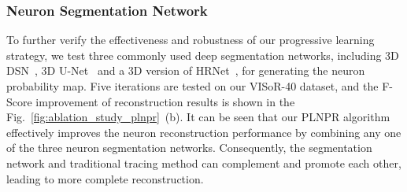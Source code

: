 

\subsubsection{Neuron Segmentation Network}

To further verify the effectiveness and robustness of our progressive learning strategy, we test three commonly used deep segmentation networks, including 3D DSN~\cite{Dou2017}, 3D U-Net~\cite{Cicek2016} and a 3D version of HRNet~\cite{Sun2019}, for generating the neuron probability map.
Five iterations are tested on our VISoR-40 dataset, and the F-Score improvement of reconstruction results is shown in the Fig.~\ref{fig:ablation_study_plnpr}~(b). 
%
It can be seen that our PLNPR algorithm effectively improves the neuron reconstruction performance by combining any one of the three neuron segmentation networks.
Consequently, the segmentation network and traditional tracing method can complement and promote each other, leading to more complete reconstruction.


